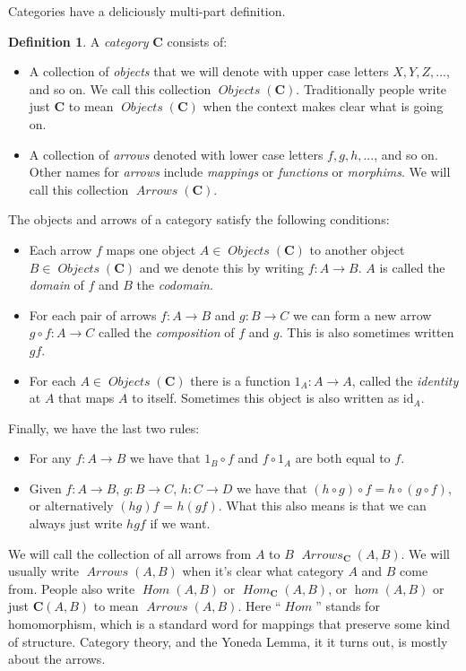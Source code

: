 \documentclass[12pt]{article}
\theoremstyle{definition}
\theoremstyle{definition}
\newtheorem{defn}{Definition}[]
\theoremstyle{definition}
\numberwithin{equation}{section}
\newcommand{\cat}[1]{\mathbf{#1}}      %
\newcommand{\id}{\mathrm{id}} %
\newcommand{\CC}{\cat{C}}
\DeclareMathOperator{\Arrows}{\mathit{Arrows}}
\DeclareMathOperator{\Objects}{\mathit{Objects}}
\DeclareMathOperator{\Hom}{\mathit{Hom}}
\DeclareMathOperator{\ihom}{\mathit{hom}}
\def\objc{\Objects(\cat{C})}
\def\ni{\goodbreak\noindent}
\begin{document}
Categories have a deliciously multi-part definition.

\begin{defn}
\label{category}
A {\it category} $\CC$ consists of:
%
\begin{itemize}
\item 
A collection of {\it objects} that we will denote with upper case letters $X, Y, Z, ...$,
and so on.  
We call this collection $\objc$. Traditionally people write just $\CC$ to mean $\objc$
when the context makes clear what is going on.
\item
A collection of {\it arrows} denoted with lower case letters $f, g, h, ...$, and so on.
Other names for {\it arrows} include {\it mappings} or {\it functions} or {\it morphims}.
We will call this collection $\Arrows(\CC)$. \end{itemize}%
The objects and arrows of a category satisfy the following conditions:
\begin{itemize}
\item
Each arrow $f$ maps one object $A \in \objc$ to another object $B \in \objc$ and we denote
this by writing $f: A \to B$. $A$ is called the {\it domain} of $f$ and $B$ the {\it
codomain}.
\item
For each pair of arrows $f:A \to B$ and $g : B \to C$ we can form a new arrow $g \circ f:
A \to C$ called the {\it composition} of $f$ and $g$. This is also sometimes written $gf$.
\item
For each $A \in \objc$ there is a function $1_A: A \to A$, called the {\it identity} at
$A$ that maps $A$ to itself. Sometimes this object is also written as $\id_A$.
\end{itemize}
\goodbreak\ni Finally, we have the last two rules:

\begin{itemize}
\item For any $f: A \to B$ we have that $1_B \circ f$ and $f \circ 1_A$ are both equal to
$f$. 
\item Given $f: A \to B$, $g: B \to C$, $h: C\to D$ we have that $(h \circ g) \circ f = h
\circ (g \circ f)$, or alternatively $(hg)f$ = $h(gf)$. What this also means is that we
can always just write $hgf$ if we want. \end{itemize}%
\end{defn}%
\ni
We will call the collection of all arrows from $A$ to $B$ $\Arrows_{\CC}(A, B)$. We will
usually write $\Arrows(A,B)$ when it's clear what category $A$ and $B$ come from. People
also write $\Hom(A, B)$ or $\Hom_{\CC}(A,B)$, or $\ihom(A, B)$ or just $\CC(A,B)$ to mean
$\Arrows(A,B)$. Here ``$\Hom$'' stands for homomorphism, which is a standard word for
mappings that preserve some kind of structure. Category theory, and the Yoneda Lemma, it
it turns out, is mostly about the arrows.
\end{document}
